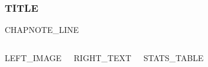 %
%

\begin{frame}
  \frametitle{{{TITLE}}}
  {{CHAPNOTE_LINE}}
  \vskip0.05cm
  \begin{columns}[T, onlytextwidth]
    \vskip0.1cm
    {{LEFT_IMAGE}}

    \vskip0.3cm
    \small
    {{RIGHT_TEXT}}

    {{STATS_TABLE}}
  \end{columns}
\end{frame}

%
